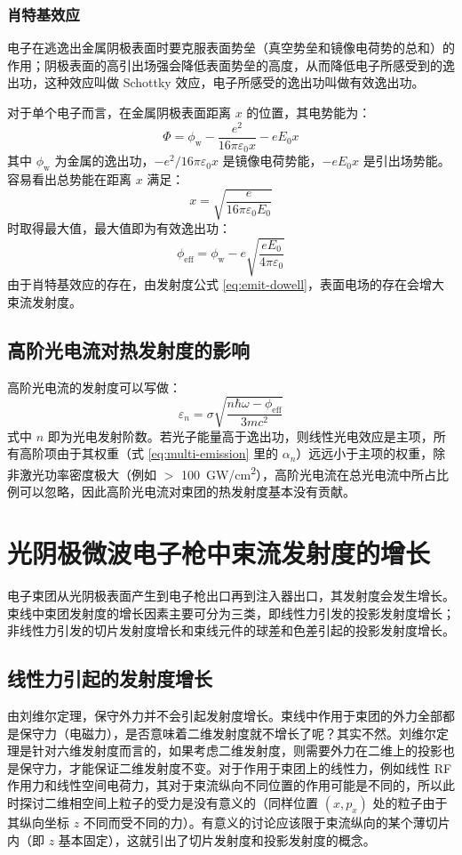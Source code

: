 \subsubsection{肖特基效应}
	电子在逃逸出金属阴极表面时要克服表面势垒（真空势垒和镜像电荷势的总和）的作用；阴极表面的高引出场强会降低表面势垒的高度，从而降低电子所感受到的逸出功，这种效应叫做 Schottky 效应\cite{tersoff1984schottky}，电子所感受的逸出功叫做有效逸出功。

	对于单个电子而言，在金属阴极表面距离 $x$ 的位置，其电势能为：
	\[
	\Phi = \phi_{\mathrm{w}} - \frac{e^2}{16\pi\varepsilon_0x} - eE_0x
	\]
	其中 $\phi_{\mathrm{w}}$ 为金属的逸出功，$-e^2/16\pi\varepsilon_0x$ 是镜像电荷势能，$- eE_0x$ 是引出场势能。
	容易看出总势能在距离 $x$ 满足：
	\[
	x = \sqrt{\frac{e}{16\pi\varepsilon_0E_0}}
	\]
	时取得最大值，最大值即为有效逸出功：
	\begin{equation}
	\phi_{\mathrm{eff}} = \phi_{\mathrm{w}} - e\sqrt{\frac{eE_0}{4\pi\varepsilon_0}}
	\end{equation}
由于肖特基效应的存在，由发射度公式 \ref{eq:emit-dowell}，表面电场的存在会增大束流发射度。

\subsection{高阶光电流对热发射度的影响}
高阶光电流的发射度可以写做：
\begin{equation}
	\varepsilon_{n} =\sigma\sqrt{\dfrac{n\hbar\omega-\phi_{\mathrm{eff}}}{3mc^2}}
\end{equation}
式中 $n$ 即为光电发射阶数。若光子能量高于逸出功，则线性光电效应是主项，所有高阶项由于其权重（式 \ref{eq:multi-emission} 里的 $\alpha_n$）远远小于主项的权重，除非激光功率密度极大（例如 $>$ \SI{100}{GW/cm^2}），高阶光电流在总光电流中所占比例可以忽略，因此高阶光电流对束团的热发射度基本没有贡献。

\section{光阴极微波电子枪中束流发射度的增长}
电子束团从光阴极表面产生到电子枪出口再到注入器出口，其发射度会发生增长。束线中束团发射度的增长因素主要可分为三类，即线性力引发的投影发射度增长；非线性力引发的切片发射度增长和束线元件的球差和色差引起的投影发射度增长。
\subsection{线性力引起的发射度增长}
由刘维尔定理，保守外力并不会引起发射度增长。束线中作用于束团的外力全部都是保守力（电磁力），是否意味着二维发射度就不增长了呢？其实不然。刘维尔定理是针对六维发射度而言的，如果考虑二维发射度，则需要外力在二维上的投影也是保守力，才能保证二维发射度不变。对于作用于束团上的线性力，例如线性 RF 作用力和线性空间电荷力，其对于束流纵向不同位置的作用可能是不同的，所以此时探讨二维相空间上粒子的受力是没有意义的（同样位置 $(x, p_x)$ 处的粒子由于其纵向坐标 $z$ 不同而受不同的力）。有意义的讨论应该限于束流纵向的某个薄切片内（即 $z$ 基本固定），这就引出了切片发射度和投影发射度的概念。

